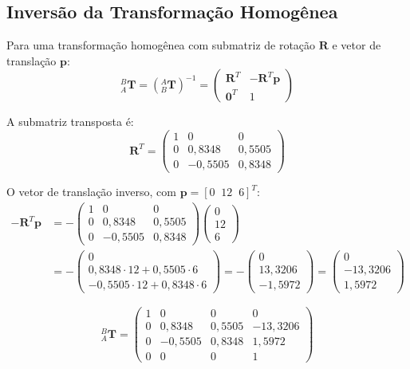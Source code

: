 \documentclass[12pt,a4paper]{article}
\newcommand{\Trans}[2]{{}^{#1}_{#2}\!\mathbf{T}}
\begin{document}
\subsection{Inversão da Transformação Homogênea}

Para uma transformação homogênea com submatriz de rotação $\mathbf{R}$ e vetor de translação $\mathbf{p}$:
\[
  \Trans{B}{A} = \left(\Trans{A}{B}\right)^{-1} =
  \begin{pmatrix} \mathbf{R}^T & -\mathbf{R}^T\mathbf{p} \\ \mathbf{0}^T & 1 \end{pmatrix}
\]

A submatriz transposta é:
\[
\mathbf{R}^T =
\begin{pmatrix}
  1 & 0        & 0        \\
  0 & 0{,}8348 & 0{,}5505 \\
  0 &-0{,}5505 & 0{,}8348
\end{pmatrix}
\]

O vetor de translação inverso, com $\mathbf{p} = [0\;\;12\;\;6]^T$:
\begin{align*}
  -\mathbf{R}^T\mathbf{p} &= -
  \begin{pmatrix}
    1 & 0        & 0        \\
    0 & 0{,}8348 & 0{,}5505 \\
    0 &-0{,}5505 & 0{,}8348
  \end{pmatrix}
  \begin{pmatrix} 0 \\ 12 \\ 6 \end{pmatrix} \\[6pt]
  &= -\begin{pmatrix}
    0 \\
    0{,}8348\cdot12 + 0{,}5505\cdot6 \\
    -0{,}5505\cdot12 + 0{,}8348\cdot6
  \end{pmatrix}
  = -\begin{pmatrix} 0 \\ 13{,}3206 \\ -1{,}5972 \end{pmatrix}
  = \begin{pmatrix} 0 \\ -13{,}3206 \\ 1{,}5972 \end{pmatrix}
\end{align*}

\begin{tcolorbox}[resultbox]
\[
\Trans{B}{A} =
\begin{pmatrix}
  1 & 0        &  0        &  0        \\
  0 & 0{,}8348 &  0{,}5505 & -13{,}3206 \\
  0 &-0{,}5505 &  0{,}8348 &   1{,}5972 \\
  0 & 0        &  0        &   1
\end{pmatrix}
\]
\end{tcolorbox}
\end{document}
